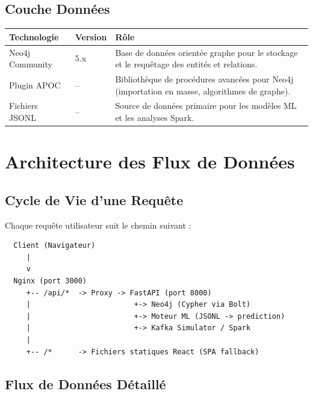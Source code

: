 \documentclass[12pt,a4paper]{article}
\begin{document}
\subsection{Couche Données}

\begin{longtable}{|p{3.5cm}|p{2.5cm}|p{7.5cm}|}
\hline
\rowcolor{bleu!15}
\textbf{Technologie} & \textbf{Version} & \textbf{Rôle} \\
\hline
Neo4j Community & 5.x & Base de données orientée graphe pour le stockage et le requêtage des entités et relations. \\
\hline
Plugin APOC & -- & Bibliothèque de procédures avancées pour Neo4j (importation en masse, algorithmes de graphe). \\
\hline
Fichiers JSONL & -- & Source de données primaire pour les modèles ML et les analyses Spark. \\
\hline
\end{longtable}

\section{Architecture des Flux de Données}

\subsection{Cycle de Vie d'une Requête}

Chaque requête utilisateur suit le chemin suivant :

\begin{verbatim}
  Client (Navigateur)
     |
     v
  Nginx (port 3000)
     +-- /api/*  -> Proxy -> FastAPI (port 8000)
     |                        +-> Neo4j (Cypher via Bolt)
     |                        +-> Moteur ML (JSONL -> prediction)
     |                        +-> Kafka Simulator / Spark
     |
     +-- /*      -> Fichiers statiques React (SPA fallback)
\end{verbatim}

\subsection{Flux de Données Détaillé}
\end{document}
